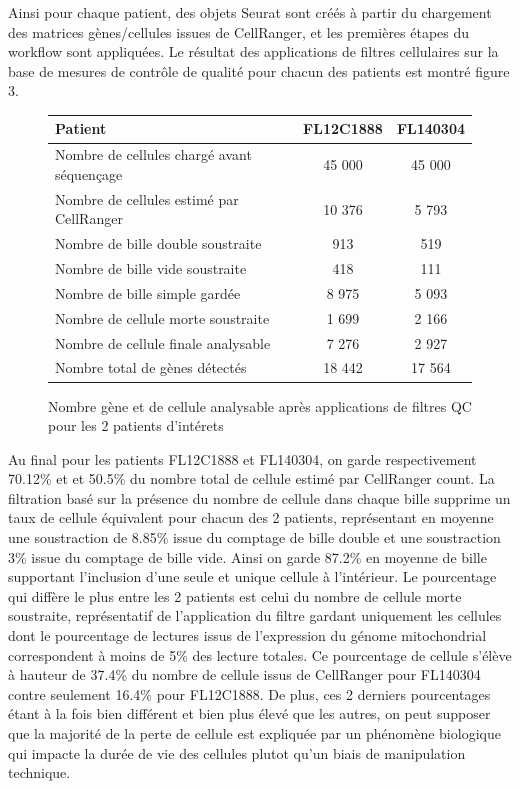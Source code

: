 \documentclass[12pt]{report}
\begin{document}
Ainsi pour chaque patient, des objets Seurat sont créés à partir du chargement des matrices gènes/cellules issues de CellRanger, et les premières étapes du workflow sont appliquées.
Le résultat des applications de filtres cellulaires sur la base de mesures de contrôle de qualité pour chacun des patients est montré figure 3.

\begin{figure}[h!]
	\begin{center}
		\begin{tabular}{|l||c|c|}
			\hline
			Patient 											& FL12C1888 	& FL140304 		\\ \hline
			Nombre de cellules chargé avant séquençage			& 45 000 		& 45 000 		\\ \hline
			Nombre de cellules estimé par CellRanger 			& 10 376 		& 5 793 		\\ \hline
			Nombre de bille double soustraite					& 913 			& 519	 		\\ \hline
			Nombre de bille vide soustraite						& 418 			& 111			\\ \hline
			Nombre de bille simple gardée						& 8 975 		& 5 093 		\\ \hline
			Nombre de cellule morte	soustraite					& 1 699 		& 2 166 		\\ \hline \hline
			Nombre de cellule finale analysable					& 7 276 		& 2 927 		\\ \hline
			Nombre total de gènes détectés						& 18 442 		& 17 564 		\\ \hline
		\end{tabular}
	\end{center}
	\caption{\small{Nombre gène et de cellule analysable après applications de filtres QC pour les 2 patients d'intérets}}
	\label{I1}
\end{figure}

Au final pour les patients FL12C1888 et FL140304, on garde respectivement 70.12\% et et 50.5\% du nombre total de cellule
estimé par CellRanger count. La filtration basé sur la présence du nombre de cellule dans chaque bille supprime un taux
de cellule équivalent pour chacun des 2 patients, représentant en moyenne une soustraction de 8.85\% issue du comptage de bille double 
et une soustraction 3\% issue du comptage de bille vide. Ainsi on garde 87.2\% en moyenne de bille supportant l'inclusion d'une seule et unique cellule à l'intérieur. 
Le pourcentage qui diffère le plus entre les 2 patients est celui du nombre de cellule morte soustraite, 
représentatif de l'application du filtre gardant uniquement les cellules dont le pourcentage de lectures issus de 
l'expression du génome mitochondrial correspondent à moins de 5\% des lecture totales.
Ce pourcentage de cellule s'élève à hauteur de 37.4\% du nombre de cellule issus de CellRanger pour FL140304
contre seulement 16.4\% pour FL12C1888. De plus, ces 2 derniers pourcentages étant à la fois bien différent et bien plus élevé que les autres,
on peut supposer que la majorité de la perte de cellule est expliquée par un phénomène biologique qui impacte la durée de vie 
des cellules plutot qu'un biais de manipulation technique.
\end{document}
